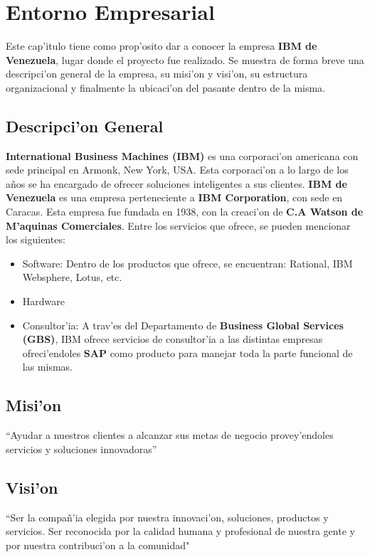 \chapter{Entorno Empresarial} \label{chap:empresa}

	Este cap'itulo tiene como prop'osito dar a conocer la empresa \textbf{IBM de Venezuela}, lugar donde el proyecto fue realizado. Se muestra de forma breve una descripci'on general de la empresa, su misi'on y visi'on, su estructura organizacional y finalmente la ubicaci'on del pasante dentro de la misma.
\section{Descripci'on General} \label{sect:descripcion}
\textbf{International Business Machines (IBM)} es una corporaci'on americana con sede principal en Armonk, New York, USA. Esta corporaci'on a lo largo de los a\~nos se ha encargado de ofrecer soluciones inteligentes a sus clientes.
\newline
\newline
\indent \textbf{IBM de Venezuela} es una empresa perteneciente a \textbf{IBM Corporation}, con sede en Caracas. Esta empresa fue fundada en 1938, con la creaci'on de \textbf{C.A Watson de M'aquinas Comerciales}.   Entre los servicios que ofrece, se pueden mencionar los siguientes:
\begin{itemize}
\item Software: Dentro de los productos que ofrece, se encuentran: Rational, IBM Websphere, Lotus, etc.
\item Hardware
\item Consultor'ia: A trav'es del Departamento de \textbf{Business Global Services (GBS)}, IBM ofrece servicios de consultor'ia a las distintas empresas ofreci'endoles \textbf{SAP} como producto para manejar toda la parte funcional de las mismas.
\end{itemize}

\section{Misi'on} \label{sect:mision}
``Ayudar a nuestros clientes a alcanzar sus metas de negocio provey'endoles servicios y soluciones innovadoras''

\section{Visi'on} \label{sect:vision}
``Ser la compa\~n'ia elegida por nuestra innovaci'on, soluciones, productos y servicios. Ser reconocida por la calidad humana y profesional de nuestra gente y por nuestra contribuci'on a la comunidad"

